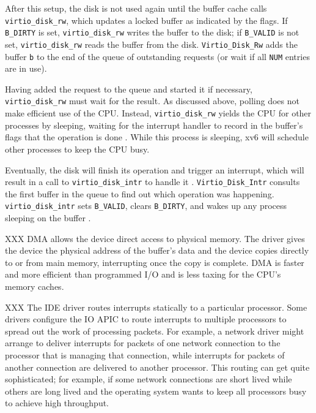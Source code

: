 After this setup, the disk is not used again until the buffer cache calls
\lstinline{virtio_disk_rw},
which updates a locked buffer
as indicated by the flags.
If
\lstinline{B_DIRTY}
is set,
\lstinline{virtio_disk_rw}
writes the buffer
to the disk; if
\lstinline{B_VALID}
is not set,
\lstinline{virtio_disk_rw}
reads the buffer from the disk.
\lstinline{Virtio_Disk_Rw}
adds the buffer
\lstinline{b}
to the end of the queue of outstanding requests (or wait if all
\lstinline{NUM} entries are in use).

Having added the request to the queue and started it if necessary,
\lstinline{virtio_disk_rw}
must wait for the result.  As discussed above,
polling does not make efficient use of the CPU.
Instead,
\lstinline{virtio_disk_rw}
yields the CPU for other processes by sleeping,
waiting for the interrupt handler to 
record in the buffer's flags that the operation is done
.
While this process is sleeping,
xv6 will schedule other processes to keep the CPU busy.

Eventually, the disk will finish its operation and trigger an
interrupt, which will result in a call to
\lstinline{virtio_disk_intr}
to handle it
.
\lstinline{Virtio_Disk_Intr}
consults the first buffer in the queue to find
out which operation was happening.
\lstinline{virtio_disk_intr}
sets 
\lstinline{B_VALID},
clears
\lstinline{B_DIRTY},
and wakes up any process sleeping on the buffer
.

XXX DMA allows the device direct access to physical memory.
The driver gives the device the physical address of the buffer's data and
the device copies directly to or from main memory,
interrupting once the copy is complete.
DMA is faster and more efficient than programmed I/O
and is less taxing for the CPU's memory caches.

XXX The IDE driver routes interrupts statically to a particular processor.  Some
drivers configure the IO APIC
to route interrupts to multiple processors to spread out
the work of processing packets.
For example, a network driver might arrange to deliver interrupts
for packets of one network connection to the processor that is managing that
connection, while interrupts for packets of another connection are delivered to
another processor.  This routing can get quite sophisticated; for example, if
some network connections are short lived while others are long lived and the
operating system wants to keep all processors busy to achieve high throughput.


